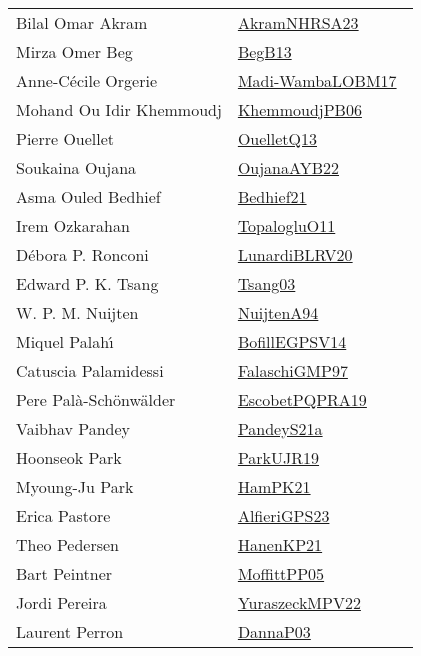{\begin{longtable}{p{4cm}p{20cm}}
Bilal Omar Akram & \href{works/AkramNHRSA23.pdf}{AkramNHRSA23}~\cite{AkramNHRSA23}\\
Mirza Omer Beg & \href{works/BegB13.pdf}{BegB13}~\cite{BegB13}\\
Anne{-}C{\'{e}}cile Orgerie & \href{works/Madi-WambaLOBM17.pdf}{Madi-WambaLOBM17}~\cite{Madi-WambaLOBM17}\\
Mohand Ou Idir Khemmoudj & \href{works/KhemmoudjPB06.pdf}{KhemmoudjPB06}~\cite{KhemmoudjPB06}\\
Pierre Ouellet & \href{works/OuelletQ13.pdf}{OuelletQ13}~\cite{OuelletQ13}\\
Soukaina Oujana & \href{works/OujanaAYB22.pdf}{OujanaAYB22}~\cite{OujanaAYB22}\\
Asma Ouled Bedhief & \href{works/Bedhief21.pdf}{Bedhief21}~\cite{Bedhief21}\\
Irem Ozkarahan & \href{works/TopalogluO11.pdf}{TopalogluO11}~\cite{TopalogluO11}\\
D{\'{e}}bora P. Ronconi & \href{works/LunardiBLRV20.pdf}{LunardiBLRV20}~\cite{LunardiBLRV20}\\
Edward P. K. Tsang & \href{works/Tsang03.pdf}{Tsang03}~\cite{Tsang03}\\
W. P. M. Nuijten & \href{works/NuijtenA94.pdf}{NuijtenA94}~\cite{NuijtenA94}\\
Miquel Palah{\'{\i}} & \href{works/BofillEGPSV14.pdf}{BofillEGPSV14}~\cite{BofillEGPSV14}\\
Catuscia Palamidessi & \href{works/FalaschiGMP97.pdf}{FalaschiGMP97}~\cite{FalaschiGMP97}\\
Pere Pal{\`{a}}{-}Sch{\"{o}}nw{\"{a}}lder & \href{works/EscobetPQPRA19.pdf}{EscobetPQPRA19}~\cite{EscobetPQPRA19}\\
Vaibhav Pandey & \href{works/PandeyS21a.pdf}{PandeyS21a}~\cite{PandeyS21a}\\
Hoonseok Park & \href{works/ParkUJR19.pdf}{ParkUJR19}~\cite{ParkUJR19}\\
Myoung-Ju Park & \href{works/HamPK21.pdf}{HamPK21}~\cite{HamPK21}\\
Erica Pastore & \href{works/AlfieriGPS23.pdf}{AlfieriGPS23}~\cite{AlfieriGPS23}\\
Theo Pedersen & \href{works/HanenKP21.pdf}{HanenKP21}~\cite{HanenKP21}\\
Bart Peintner & \href{works/MoffittPP05.pdf}{MoffittPP05}~\cite{MoffittPP05}\\
Jordi Pereira & \href{works/YuraszeckMPV22.pdf}{YuraszeckMPV22}~\cite{YuraszeckMPV22}\\
Laurent Perron & \href{works/DannaP03.pdf}{DannaP03}~\cite{DannaP03}\\

\end{longtable}}
